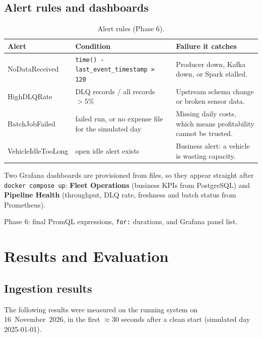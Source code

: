\documentclass[11pt,a4paper]{article}
\newcommand{\code}[1]{\texttt{\small #1}}
\newcommand{\tocomplete}[1]{%
  \begin{tcolorbox}[colback=orange!6,colframe=orange!70!black,
    title=To complete (evidence from the running system),fonttitle=\bfseries\small,
    boxrule=0.6pt,arc=1mm]\small #1\end{tcolorbox}}
\begin{document}
\subsection{Alert rules and dashboards}

\begin{table}[H]
\centering\small
\begin{tabularx}{\linewidth}{l Y Y}
\toprule
\textbf{Alert} & \textbf{Condition} & \textbf{Failure it catches} \\
\midrule
NoDataReceived & \code{time() - last\_event\_timestamp > 120} & Producer down, Kafka down, or
Spark stalled. \\
HighDLQRate & DLQ records / all records $>5\%$ & Upstream schema change or broken sensor
data. \\
BatchJobFailed & failed run, or no expense file for the simulated day & Missing daily costs,
which means profitability cannot be trusted. \\
VehicleIdleTooLong & open idle alert exists & Business alert: a vehicle is wasting capacity. \\
\bottomrule
\end{tabularx}
\caption{Alert rules (Phase 6).}
\label{tab:alerts}
\end{table}

Two Grafana dashboards are provisioned from files, so they appear straight after
\code{docker compose up}: \textbf{Fleet Operations} (business KPIs from PostgreSQL) and
\textbf{Pipeline Health} (throughput, DLQ rate, freshness and batch status from Prometheus).

\tocomplete{Phase 6: final PromQL expressions, \code{for:} durations, and Grafana panel list.}

\section{Results and Evaluation}

\subsection{Ingestion results}

The following results were measured on the running system on 16~November~2026, in the first
$\approx$30 seconds after a clean start (simulated day 2025-01-01).
\end{document}
